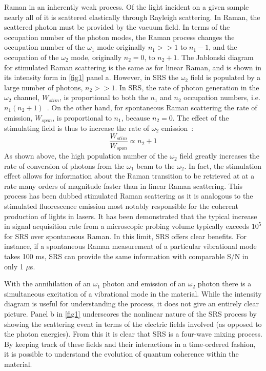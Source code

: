 Raman in an inherently weak process. Of the light incident on a given sample nearly all of it is scattered elastically through Rayleigh scattering.  In Raman, the scattered photon must be provided by the vacuum field.  In terms of the occupation number of the photon modes, the Raman process changes the occupation number of the $\omega_1$ mode originally $n_1>>1$ to $n_1-1$, and the occupation of the $\omega_2$ mode, originally $n_2=0$, to $n_2+1$.  The Jablonski diagram for stimulated Raman scattering is the same as for linear Raman, and is shown in its intensity form in \ref{fig1} panel a.  However, in SRS the $\omega_2$ field is populated by a large number of photons, $n_2>>1$.  In SRS, the rate of photon generation in the $\omega_2$ channel, $W_{stim}$, is proportional to both the $n_1$ and $n_2$ occupation numbers, i.e. $n_1(n_2+1)$~\cite{Hellwarth1963}. On the other hand, for spontaneous Raman scattering the rate of emission, $W_{spon}$, is proportional to $n_1$, because $n_2=0$. The effect of the stimulating field is thus to increase the rate of $\omega_2$ emission~\cite{Crampton2016}:
\begin{equation}
\frac{W_{stim}}{W_{spon}}\propto n_2 + 1\label{eq:stimspon}
\end{equation}
As shown above, the high population number of the $\omega_2$ field greatly increases the rate of conversion of photons from the $\omega_1$ beam to the $\omega_2$.  In fact, the stimulation effect allows for information about the Raman transition to be retrieved at at a rate many orders of magnitude faster than in linear Raman scattering. This process has been dubbed stimulated Raman scattering as it is analogous to the stimulated fluorescence emission most notably responsible for the coherent production of lights in lasers. It has been demonstrated that the typical increase in signal acquisition rate from a microscopic probing volume typically exceeds $10^5$ for SRS over spontaneous Raman. In this limit, SRS offers clear benefits. For instance, if a spontaneous Raman measurement of a particular vibrational mode takes 100 ms, SRS can provide the same information with comparable S/N in only 1 $\mu$s.  

With the annihilation of an $\omega_1$ photon and emission of an $\omega_2$ photon there is a simultaneous excitation of a vibrational mode in the material. While the intensity diagram is useful for understanding the process, it does not give an entirely clear picture.  Panel b in \ref{fig1} underscores the nonlinear nature of the SRS process by showing the scattering event in terms of the electric fields involved (as opposed to the photon energies).  From this it is clear that SRS is a four-wave mixing process. By keeping track of these fields and their interactions in a time-ordered fashion, it is possible to understand the evolution of quantum coherence within the material.  

